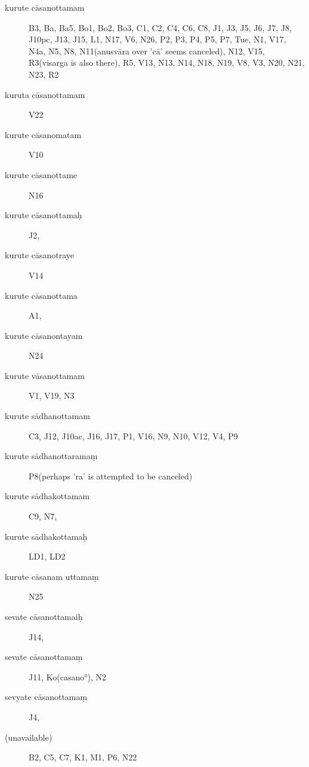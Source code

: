 \begin{ekdosis}
         
\begin{marma}[hp01_052]
 \begin{description}
 \item[kurute cāsanottamam] B3, Ba, Ba5, Bo1, Bo2, Bo3, C1, C2, C4, C6, C8, J1, J3, J5, J6, J7, J8,
        J10pc, J13, J15, L1, N17, V6, N26, P2, P3, P4, P5, P7, Tue, N1, V17, N4a, N5, N8, N11(anusvāra
        over 'cā' seems canceled), N12, V15, R3(visarga is also there), R5, V13, N13, N14, N18, N19,
        V8, V3, N20, N21, N23, R2
\item[kuruta cāsanottamam]        V22
\item[kurute cāsanomatam]        V10
\item[kurute cāsanottame]        N16
\item[kurute cāsanottamaḥ]        J2,
\item[kurute cāsanotraye]        V14
\item[kurute cāsanottama]        A1,
\item[kurute cāsanontayam]   N24
\item[kurute vāsanottamam]        V1, V19, N3
\item[kurute sādhanottamam]        C3, J12, J10ac, J16, J17, P1, V16, N9, N10, V12, V4, P9
\item[kurute sādhanottaramaṃ]        P8(perhaps 'ra' is attempted to be canceled)
\item[kurute sādhakottamam]        C9, N7,
\item[kurute sādhakottamaḥ]        LD1, LD2
\item[kurute cāsanam uttamaṃ]         N25
\item[sevate cāsanottamaiḥ]        J14,
\item[sevate cāsanottamaṃ]        J11, Ko(casano°), N2
\item[sevyate cāsanottamaṃ]        J4,
\item[(unavailable)]        B2, C5, C7, K1, M1, P6, N22
        \end{description}
\end{marma}



\end{ekdosis}
